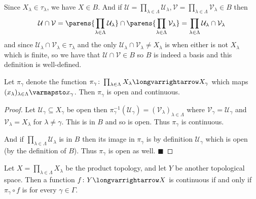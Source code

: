 \documentclass[10pt]{article}
\def\qed{\hskip1cm\penalty-100\hbox{}\hfill$\blacksquare$}
\def\mU{\mathcal{U}}
\def\mV{\mathcal{V}}
\def\longto{\longvarrightarrow}
\begin{document}
Since $X_\lambda\in\tau_\lambda$, we have $X\in B$.
And if $\mU=\prod_{\lambda\in\Lambda}\mU_\lambda,\mV=\prod_{\lambda\in\Lambda}\mV_\lambda\in B$ then
\[ \mU\cap\mV = \parens{\prod_{\lambda\in\Lambda}\mU_\lambda}\cap\parens{\prod_{\lambda\in\Lambda}\mV_\lambda} = \prod_{\lambda\in\Lambda}\mU_\lambda\cap\mV_\lambda \]
and since $\mU_\lambda\cap\mV_\lambda\in\tau_\lambda$ and the only $\mU_\lambda\cap\mV_\lambda\neq X_\lambda$ is when either is not $X_\lambda$ which is finite, so we have that $\mU\cap\mV\in B$ so $B$ is
indeed a basis and this definition is well-defined.

\begin{prop*}

    Let $\pi_\gamma$ denote the function $\pi_\gamma\colon\prod_{\lambda\in\Lambda}X_\lambda\longto X_\gamma$ which maps $(x_\lambda)_{\lambda\in\Lambda}\varmapsto x_\gamma$.
    Then $\pi_\gamma$ is open and continuous.

\end{prop*}

\begin{proof}

    Let $\mU_\gamma\subseteq X_\gamma$ be open then $\pi_\gamma^{-1}(\mU_\gamma)=(\mV_\lambda)_{\lambda\in\Lambda}$ where $\mV_\gamma=\mU_\gamma$ and $\mV_\lambda=X_\lambda$ for $\lambda\neq\gamma$.
    This is in $B$ and so is open.
    Thus $\pi_\gamma$ is continuous.

    And if $\prod_{\lambda\in\Lambda}\mU_\lambda$ is in $B$ then its image in $\pi_\gamma$ is by definition $\mU_\gamma$ which is open (by the definition of $B$).
    Thus $\pi_\gamma$ is open as well.
    \qed

\end{proof}

\begin{prop*}

    Let $X=\prod_{\lambda\in\Lambda}X_\lambda$ be the product topology, and let $Y$ be another topological space.
    Then a function $f\colon Y\longto X$ is continuous if and only if $\pi_\gamma\circ f$ is for every $\gamma\in\Gamma$.

\end{prop*}
\end{document}
